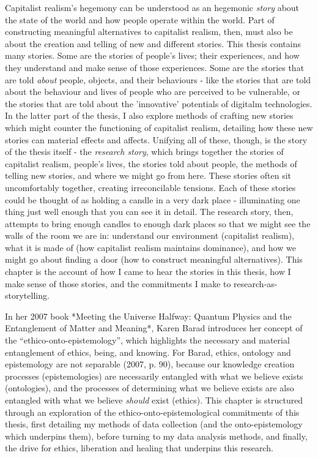 Capitalist realism's hegemony can be understood as an hegemonic \textit{story} about the state of the world and how people operate within the world. Part of constructing meaningful alternatives to capitalist realism, then, must also be about the creation and telling of new and different stories. This thesis contains many stories. Some are the stories of people’s lives; their experiences, and how they understand and make sense of those experiences. Some are the stories that are told \textit{about} people, objects, and their behaviours - like the stories that are told about the behaviour and lives of people who are perceived to be vulnerable, or the stories that are told about the 'innovative' potentials of digitalm technologies. In the latter part of the thesis, I also explore methods of  crafting new stories which might counter the functioning of capitalist realism, detailing how these new stories can material effects and affects. Unifying all of these, though, is the story of the thesis itself - the \textit{research story}, which brings together the stories of capitalist realism, people's lives, the stories told about people, the methods of telling new stories, and where we might go from here. These stories often sit uncomfortably together, creating irreconcilable tensions. Each of these stories could be thought of as holding a candle in a very dark place - illuminating one thing just well enough that you can see it in detail. The research story, then, attempts to bring enough candles to enough dark places so that we might see the walls of the room we are in: understand our environment (capitalist realism), what it is made of (how capitalist realism maintains dominance), and how we might go about finding a door (how to construct meaningful alternatives). This chapter is the account of how I came to hear the stories in this thesis, how I make sense of those stories, and the commitments I make to research-as-storytelling. 

In her 2007 book *Meeting the Universe Halfway: Quantum Physics and the Entanglement of Matter and Meaning*, Karen Barad introduces her concept of the “ethico-onto-epistemology”, which highlights the necessary and material entanglement of ethics, being, and knowing. For Barad, ethics, ontology and epistemology are not separable (2007, p. 90), because our knowledge creation processes (epistemologies) are necessarily entangled with what we believe exists (ontologies), and the processes of determining what we believe exists are also entangled with what we believe \textit{should} exist (ethics). This chapter is structured through an exploration of the ethico-onto-epistemological commitments of this thesis, first detailing my methods of data collection (and the onto-epistemology which underpins them), before turning to my data analysis methods, and finally, the drive for ethics, liberation and healing that underpins this research. 

